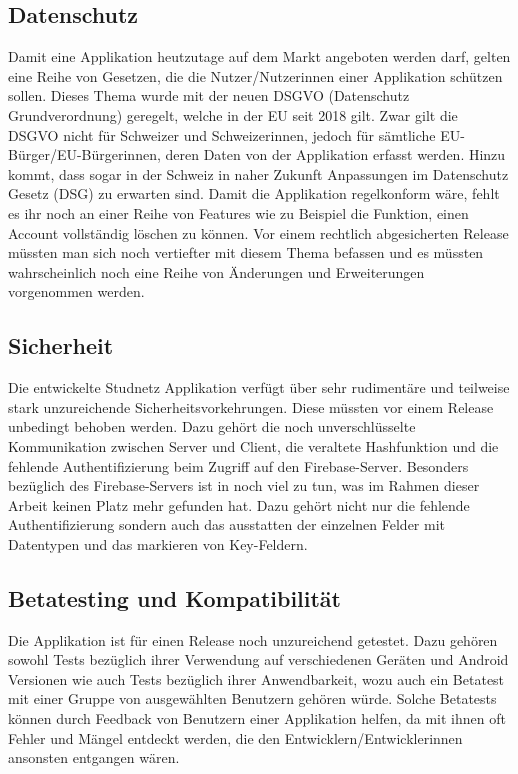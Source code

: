 \documentclass[../main.tex]{subfiles}
\begin{document}
	\subsection*{Datenschutz}
	Damit eine Applikation heutzutage auf dem Markt angeboten werden darf, gelten eine Reihe von Gesetzen, die die Nutzer/Nutzerinnen einer Applikation schützen sollen.  Dieses Thema wurde mit der neuen DSGVO (Datenschutz Grundverordnung) geregelt, welche in der EU seit 2018 gilt. Zwar gilt die DSGVO nicht für Schweizer und Schweizerinnen, jedoch für sämtliche EU-Bürger/EU-Bürgerinnen, deren Daten von der Applikation erfasst werden. Hinzu kommt, dass sogar in der Schweiz in naher Zukunft Anpassungen im Datenschutz Gesetz (DSG) zu erwarten sind. Damit die Applikation regelkonform wäre, fehlt es ihr noch an einer Reihe von Features wie zu Beispiel die Funktion, einen Account vollständig löschen zu können. Vor einem rechtlich abgesicherten Release müssten man sich noch vertiefter mit diesem Thema befassen und es müssten wahrscheinlich noch eine Reihe von Änderungen und Erweiterungen vorgenommen werden.  \cite{dsgvoschweiz}
	
	\subsection*{Sicherheit}
	Die entwickelte Studnetz Applikation verfügt über sehr rudimentäre und teilweise stark unzureichende Sicherheitsvorkehrungen. Diese müssten vor einem Release unbedingt behoben werden. Dazu gehört die noch unverschlüsselte Kommunikation zwischen Server und Client, die veraltete Hashfunktion und die fehlende Authentifizierung beim Zugriff auf den Firebase-Server. Besonders bezüglich des Firebase-Servers ist in noch viel zu tun, was im Rahmen dieser Arbeit keinen Platz mehr gefunden hat. Dazu gehört nicht nur die fehlende Authentifizierung sondern auch das ausstatten der einzelnen Felder mit Datentypen und das markieren von Key-Feldern.
	
	
	\subsection*{Betatesting und Kompatibilität}
	Die Applikation ist für einen Release noch unzureichend getestet. Dazu gehören sowohl Tests bezüglich ihrer Verwendung auf verschiedenen Geräten und Android Versionen wie auch Tests bezüglich ihrer Anwendbarkeit, wozu auch ein Betatest mit einer Gruppe von ausgewählten Benutzern gehören würde. Solche Betatests können durch Feedback von Benutzern einer Applikation helfen, da mit ihnen oft Fehler und Mängel entdeckt werden, die den Entwicklern/Entwicklerinnen ansonsten entgangen wären.
	
\end{document}

